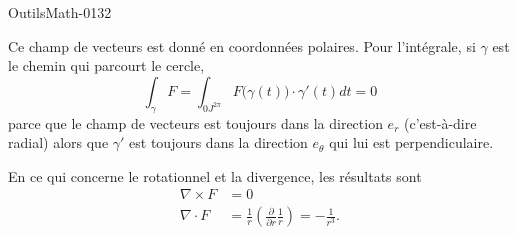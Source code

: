 
\begin{corrige}{OutilsMath-0132}

	Ce champ de vecteurs est donné en coordonnées polaires. Pour l'intégrale, si \( \gamma\) est le chemin qui parcourt le cercle,
	\begin{equation}
		\int_{\gamma}F=\int_{0J^{2\pi}}F\big( \gamma(t) \big)\cdot \gamma'(t)dt=0
	\end{equation}
	parce que le champ de vecteurs est toujours dans la direction \( e_r\) (c'est-à-dire radial) alors que \( \gamma'\) est toujours dans la direction \( e_{\theta}\) qui lui est perpendiculaire.

	En ce qui concerne le rotationnel et la divergence, les résultats sont
	\begin{subequations}
		\begin{align}
			\nabla\times F & =0                                                                                           \\
			\nabla\cdot F  & =\frac{1}{ r }\left( \frac{ \partial  }{ \partial r }\frac{1}{ r } \right)=-\frac{1}{ r^3 }.
		\end{align}
	\end{subequations}

\end{corrige}
